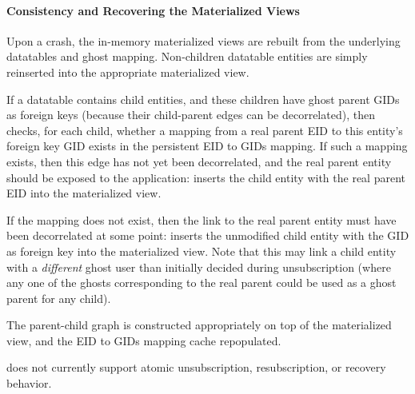 \paragraph{Consistency and Recovering the Materialized Views}
Upon a crash, the in-memory materialized views are rebuilt from the underlying datatables and ghost
mapping. Non-children datatable entities are simply reinserted into the appropriate
materialized view. 

If a datatable contains child entities, and these children have ghost parent GIDs as foreign
keys (because their child-parent edges can be decorrelated), then \sys{} checks, for each child, whether a mapping
from a real parent EID to this entity's foreign key GID exists in the persistent EID to GIDs
mapping. If such a mapping exists, then this edge has not yet been decorrelated, and the real parent
entity should be exposed to the application: \sys{} inserts the child entity with the real parent
EID into the materialized view.

If the mapping does not exist, then the link to the real parent entity must have been decorrelated at some point:
\sys{} inserts the unmodified child entity with the GID as foreign key into the materialized view.
Note that this may link a child entity with a \emph{different} ghost user than initially decided
during unsubscription (where any one of the ghosts corresponding to the real parent could be used as
a ghost parent for any child). 

The parent-child graph is constructed appropriately on top of the materialized view, and the EID to
GIDs mapping cache repopulated.

\sys{} does not currently support atomic unsubscription, resubscription, or recovery behavior.
